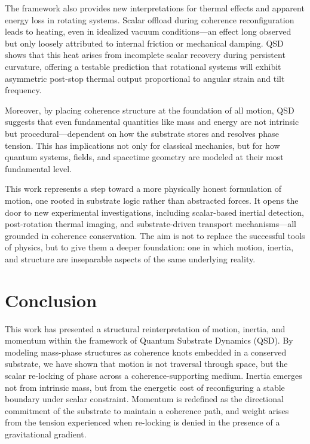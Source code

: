 \documentclass[entropy,article,submit,pdftex,moreauthors]{Definitions/mdpi}
\begin{document}
The framework also provides new interpretations for thermal effects and apparent energy loss in rotating systems. Scalar offload during coherence reconfiguration leads to heating, even in idealized vacuum conditions—an effect long observed but only loosely attributed to internal friction or mechanical damping. QSD shows that this heat arises from incomplete scalar recovery during persistent curvature, offering a testable prediction that rotational systems will exhibit asymmetric post-stop thermal output proportional to angular strain and tilt frequency.

Moreover, by placing coherence structure at the foundation of all motion, QSD suggests that even fundamental quantities like mass and energy are not intrinsic but procedural—dependent on how the substrate stores and resolves phase tension. This has implications not only for classical mechanics, but for how quantum systems, fields, and spacetime geometry are modeled at their most fundamental level.

This work represents a step toward a more physically honest formulation of motion, one rooted in substrate logic rather than abstracted forces. It opens the door to new experimental investigations, including scalar-based inertial detection, post-rotation thermal imaging, and substrate-driven transport mechanisms—all grounded in coherence conservation. The aim is not to replace the successful tools of physics, but to give them a deeper foundation: one in which motion, inertia, and structure are inseparable aspects of the same underlying reality.

\section{Conclusion}
This work has presented a structural reinterpretation of motion, inertia, and momentum within the framework of Quantum Substrate Dynamics (QSD). By modeling mass-phase structures as coherence knots embedded in a conserved substrate, we have shown that motion is not traversal through space, but the scalar re-locking of phase across a coherence-supporting medium. Inertia emerges not from intrinsic mass, but from the energetic cost of reconfiguring a stable boundary under scalar constraint. Momentum is redefined as the directional commitment of the substrate to maintain a coherence path, and weight arises from the tension experienced when re-locking is denied in the presence of a gravitational gradient.
\end{document}
